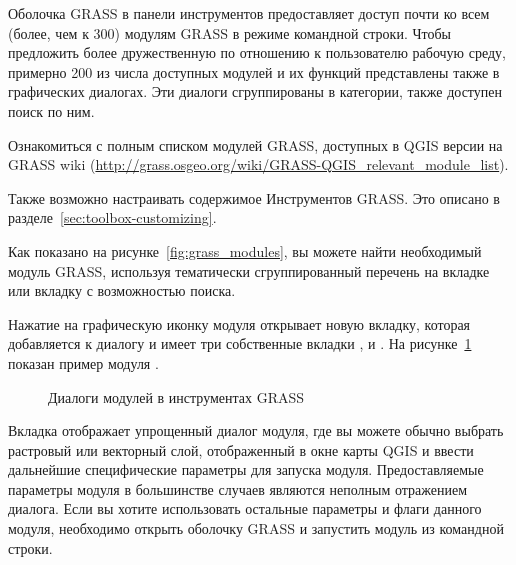 Оболочка GRASS в панели инструментов предоставляет доступ почти ко всем
(более, чем к 300) модулям GRASS в режиме командной строки. Чтобы
предложить более дружественную по отношению к пользователю рабочую среду,
примерно 200 из числа доступных модулей и их функций представлены также
в графических диалогах. Эти диалоги сгруппированы в категории, также
доступен поиск по ним.

Ознакомиться с полным списком модулей GRASS, доступных в QGIS версии \CURRENT
на GRASS wiki (\url{http://grass.osgeo.org/wiki/GRASS-QGIS_relevant_module_list}).

Также возможно настраивать содержимое Инструментов GRASS. Это описано в
разделе~\ref{sec:toolbox-customizing}.

Как показано на рисунке~\ref{fig:grass_modules}, вы можете найти
необходимый модуль GRASS, используя тематически сгруппированный
перечень на вкладке  или вкладку 
с возможностью поиска.

Нажатие на графическую иконку модуля открывает новую вкладку, которая
добавляется к диалогу и имеет три собственные вкладки ,
 и . На рисунке~\ref{fig:grass_module_dialog}
показан пример модуля .

\begin{figure}[h]
\centering
   \hspace{1cm}
   \hspace{1cm}
\caption{Диалоги модулей в инструментах GRASS \wincaption}\label{fig:grass_module_dialog}
\end{figure}
\FloatBarrier
{}

Вкладка  отображает упрощенный диалог модуля, где вы
можете обычно выбрать растровый или векторный слой, отображенный в окне
карты QGIS и ввести дальнейшие специфические параметры для запуска
модуля. Предоставляемые параметры модуля в большинстве случаев являются
неполным отражением диалога. Если вы хотите использовать остальные
параметры и флаги данного модуля, необходимо открыть оболочку GRASS и
запустить модуль из командной строки.


